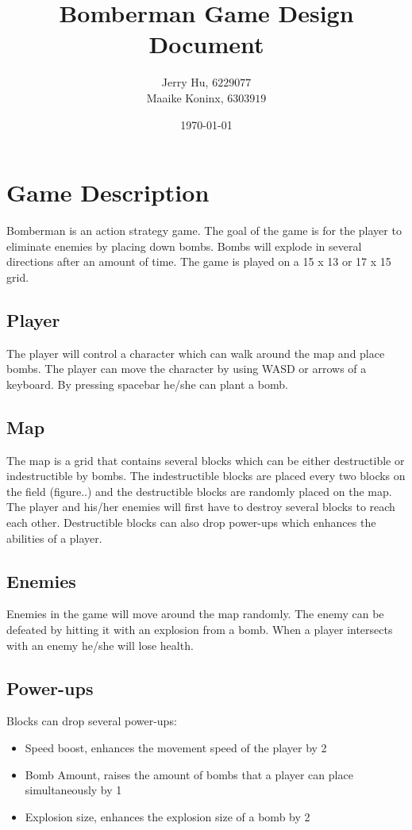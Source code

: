 \documentclass[a4paper, 12]{article}
\begin{document}
		
		\title{Bomberman Game Design Document}
		\author{Jerry Hu, $6229077$ \\ Maaike Koninx, $6303919$}
		\date{\today}	
		\maketitle
		
		\section{Game Description}
			Bomberman is an action strategy game. The goal of the game is for the player to eliminate enemies by placing down bombs. Bombs will explode in several directions after an amount of time. The game is played on a 15 x 13 or 17 x 15 grid. 
		
		\subsection{Player}
		The player will control a character which can walk around the map and place bombs. The player can move the character by using WASD or arrows of a keyboard. By pressing spacebar he/she can plant a bomb. 
		\subsection{Map}			
			The map is a grid that contains several blocks which can be either destructible or indestructible by bombs. The indestructible blocks are placed every two blocks on the field (figure..) and the destructible blocks are randomly placed on the map. The player and his/her enemies will first have to destroy several blocks to reach each other. Destructible blocks can also drop power-ups which enhances the abilities of a player. 
		
		\subsection{Enemies}
		
		Enemies in the game will move around the map randomly. The enemy can be defeated by hitting it with an explosion from a bomb. When a player intersects with an enemy he/she will lose health. 
		
		\subsection{Power-ups}
		Blocks can drop several power-ups:
		\begin{itemize}
			\item Speed boost, enhances the movement speed of the player by 2
			\item Bomb Amount, raises the amount of bombs that a player can place simultaneously by 1
			\item Explosion size, enhances the explosion size of a bomb by 2
		\end{itemize}
\end{document}
